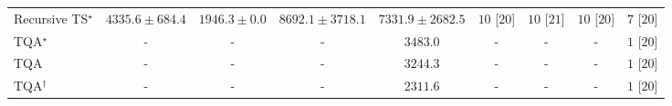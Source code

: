 \begin{tabular}{l|cccc|cccc|}
Recursive TS$^\star$ & {\cellcolor[HTML]{A7BDDB}} \color[HTML]{000000} $4335.6\pm 684.4$ & {\cellcolor[HTML]{F8F1F8}} \color[HTML]{000000} $1946.3\pm 0.0$ & {\cellcolor[HTML]{034267}} \color[HTML]{F1F1F1} $8692.1\pm 3718.1$ & {\cellcolor[HTML]{056BA7}} \color[HTML]{F1F1F1} $7331.9\pm 2682.5$ & {\cellcolor[HTML]{49006A}} \color[HTML]{F1F1F1} $10$ [$20$] & {\cellcolor[HTML]{49006A}} \color[HTML]{F1F1F1} $10$ [$21$] & {\cellcolor[HTML]{49006A}} \color[HTML]{F1F1F1} $10$ [$20$] & {\cellcolor[HTML]{CD238F}} \color[HTML]{F1F1F1} $7$ [$20$] \\
TQA$^\star$ & {\cellcolor[HTML]{000000}} \color[HTML]{F1F1F1} {\cellcolor{white}} \color{black} - & {\cellcolor[HTML]{000000}} \color[HTML]{F1F1F1} {\cellcolor{white}} \color{black} - & {\cellcolor[HTML]{000000}} \color[HTML]{F1F1F1} {\cellcolor{white}} \color{black} - & {\cellcolor[HTML]{CDD0E5}} \color[HTML]{000000} $3483.0$ & {\cellcolor[HTML]{000000}} \color[HTML]{F1F1F1} {\cellcolor{white}} \color{black} - & {\cellcolor[HTML]{000000}} \color[HTML]{F1F1F1} {\cellcolor{white}} \color{black} - & {\cellcolor[HTML]{000000}} \color[HTML]{F1F1F1} {\cellcolor{white}} \color{black} - & {\cellcolor[HTML]{FFF7F3}} \color[HTML]{000000} $1$ [$20$] \\
TQA & {\cellcolor[HTML]{000000}} \color[HTML]{F1F1F1} {\cellcolor{white}} \color{black} - & {\cellcolor[HTML]{000000}} \color[HTML]{F1F1F1} {\cellcolor{white}} \color{black} - & {\cellcolor[HTML]{000000}} \color[HTML]{F1F1F1} {\cellcolor{white}} \color{black} - & {\cellcolor[HTML]{D6D6E9}} \color[HTML]{000000} $3244.3$ & {\cellcolor[HTML]{000000}} \color[HTML]{F1F1F1} {\cellcolor{white}} \color{black} - & {\cellcolor[HTML]{000000}} \color[HTML]{F1F1F1} {\cellcolor{white}} \color{black} - & {\cellcolor[HTML]{000000}} \color[HTML]{F1F1F1} {\cellcolor{white}} \color{black} - & {\cellcolor[HTML]{FFF7F3}} \color[HTML]{000000} $1$ [$20$] \\
TQA$^\dagger$ & {\cellcolor[HTML]{000000}} \color[HTML]{F1F1F1} {\cellcolor{white}} \color{black} - & {\cellcolor[HTML]{000000}} \color[HTML]{F1F1F1} {\cellcolor{white}} \color{black} - & {\cellcolor[HTML]{000000}} \color[HTML]{F1F1F1} {\cellcolor{white}} \color{black} - & {\cellcolor[HTML]{F0EAF4}} \color[HTML]{000000} $2311.6$ & {\cellcolor[HTML]{000000}} \color[HTML]{F1F1F1} {\cellcolor{white}} \color{black} - & {\cellcolor[HTML]{000000}} \color[HTML]{F1F1F1} {\cellcolor{white}} \color{black} - & {\cellcolor[HTML]{000000}} \color[HTML]{F1F1F1} {\cellcolor{white}} \color{black} - & {\cellcolor[HTML]{FFF7F3}} \color[HTML]{000000} $1$ [$20$] \\
\cline{1-9}
\bottomrule
\end{tabular}

